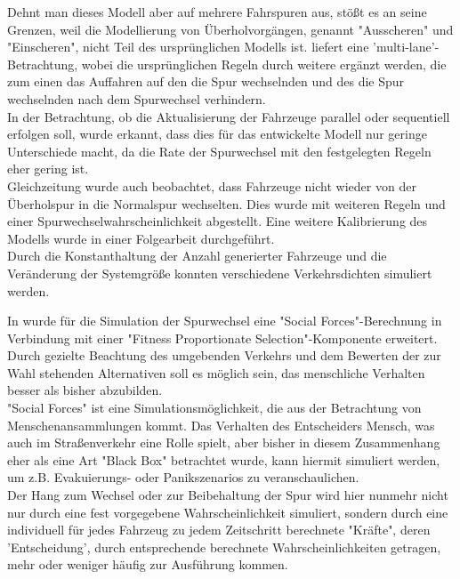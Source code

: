 Dehnt man dieses Modell aber auf mehrere Fahrspuren aus, stößt es an seine Grenzen, weil die Modellierung von Überholvorgängen, genannt "Ausscheren" und "Einscheren", nicht Teil des ursprünglichen Modells ist. \cite{multi-lane} liefert eine 'multi-lane'-Betrachtung, wobei die ursprünglichen Regeln durch weitere ergänzt werden, die zum einen das Auffahren auf den die Spur wechselnden und des die Spur wechselnden nach dem Spurwechsel verhindern. \\
In der Betrachtung, ob die Aktualisierung der Fahrzeuge parallel oder sequentiell erfolgen soll, wurde erkannt, dass dies für das entwickelte Modell nur geringe Unterschiede macht, da die Rate der Spurwechsel mit den festgelegten Regeln eher gering ist. \\
Gleichzeitung wurde auch beobachtet, dass Fahrzeuge nicht wieder von der Überholspur in die Normalspur wechselten. Dies wurde mit weiteren Regeln und einer Spurwechselwahrscheinlichkeit abgestellt. Eine weitere Kalibrierung des Modells wurde in einer Folgearbeit durchgeführt. \\
Durch die Konstanthaltung der Anzahl generierter Fahrzeuge und die Veränderung der Systemgröße konnten verschiedene Verkehrsdichten simuliert werden. 

In \cite{dat-ba} wurde für die Simulation der Spurwechsel eine "Social Forces"-Berechnung in Verbindung mit einer "Fitness Proportionate Selection"-Komponente erweitert. Durch gezielte Beachtung des umgebenden Verkehrs und dem Bewerten der zur Wahl stehenden Alternativen soll es möglich sein, das menschliche Verhalten besser als bisher abzubilden. \\
"Social Forces" ist eine Simulationsmöglichkeit, die aus der Betrachtung von Menschenansammlungen kommt. Das Verhalten des Entscheiders Mensch, was auch im Straßenverkehr eine Rolle spielt, aber bisher in diesem Zusammenhang eher als eine Art "Black Box" betrachtet wurde, kann hiermit simuliert werden, um z.B. Evakuierungs- oder Panikszenarios zu veranschaulichen.\\
Der Hang zum Wechsel oder zur Beibehaltung der Spur wird hier nunmehr nicht nur durch eine fest vorgegebene Wahrscheinlichkeit simuliert, sondern durch eine individuell für jedes Fahrzeug zu jedem Zeitschritt berechnete "Kräfte", deren 'Entscheidung', durch entsprechende berechnete Wahrscheinlichkeiten getragen, mehr oder weniger häufig zur Ausführung kommen. 